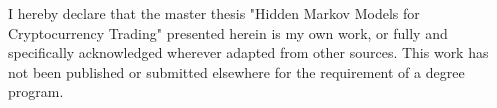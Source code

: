 
\begin{declaration}

I hereby declare that the master thesis "Hidden Markov Models for Cryptocurrency Trading" presented herein is my own work, 
or fully and specifically acknowledged wherever adapted from other sources. 
This work has not been published or submitted elsewhere for the requirement of a degree program. 

\end{declaration}

